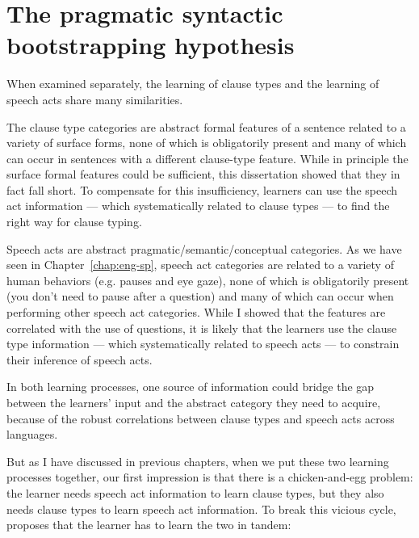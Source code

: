 \section{The pragmatic syntactic bootstrapping hypothesis}



When examined separately, the learning of clause types and the learning of speech acts share many similarities. 


The clause type categories are abstract formal features of a sentence related to a variety of surface forms, none of which is obligatorily present and many of which can occur in sentences with a different clause-type feature. While in principle the surface formal features could be sufficient, this dissertation showed that they in fact fall short. To compensate for this insufficiency, learners can use the speech act information --- which systematically related to clause types --- to find the right way for clause typing.  

Speech acts are abstract pragmatic/semantic/conceptual categories. As we have seen in Chapter~\ref{chap:eng-sp}, speech act categories are related to a variety of human behaviors (e.g. pauses and eye gaze), none of which is obligatorily present (you don't need to pause after a question) and many of which can occur when performing other speech act categories. While I showed that the features are correlated with the use of questions, it is likely that the learners use the clause type information --- which systematically related to speech acts --- to constrain their inference of speech acts.  

In both learning processes, one source of information could bridge the gap between the learners' input and the abstract category they need to acquire, because of the robust correlations between clause types and speech acts across languages. 

But as I have discussed in previous chapters, when we put these two learning processes together, our first impression is that there is a chicken-and-egg problem: the learner needs speech act information to learn clause types, but they also needs clause types to learn speech act information. To break this vicious cycle, \hypos{} proposes that the learner has to learn the two in tandem:

